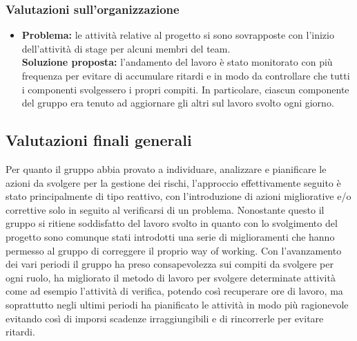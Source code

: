 \subsubsection{Valutazioni sull'organizzazione}
\begin{itemize}
	\item \textbf{Problema:} le attività relative al progetto si sono sovrapposte con l'inizio dell'attività di stage per alcuni membri del team.\\
	\textbf{Soluzione proposta:} l'andamento del lavoro è stato monitorato con più frequenza per evitare di accumulare ritardi e in modo da controllare che tutti i componenti svolgessero i propri compiti. In particolare, ciascun componente del gruppo era tenuto ad aggiornare gli altri sul lavoro svolto ogni giorno.
\end{itemize}

\subsection{Valutazioni finali generali} \label{MiglioramentoFinale}
Per quanto il gruppo abbia provato a individuare, analizzare e pianificare le azioni da svolgere per la gestione dei rischi, l'approccio effettivamente seguito è stato principalmente di tipo reattivo, con l'introduzione di azioni migliorative e/o correttive solo in seguito al verificarsi di un problema. Nonostante questo il gruppo si ritiene soddisfatto del lavoro svolto in quanto con lo svolgimento del progetto sono comunque stati introdotti una serie di miglioramenti che hanno permesso al gruppo di correggere il proprio way of working. Con l'avanzamento dei vari periodi il gruppo ha preso consapevolezza sui compiti da svolgere per ogni ruolo, ha migliorato il metodo di lavoro per svolgere determinate attività come ad esempio l'attività di verifica, potendo così recuperare ore di lavoro, ma soprattutto negli ultimi periodi ha pianificato le attività in modo più ragionevole evitando così di imporsi scadenze irraggiungibili e di rincorrerle per evitare ritardi.